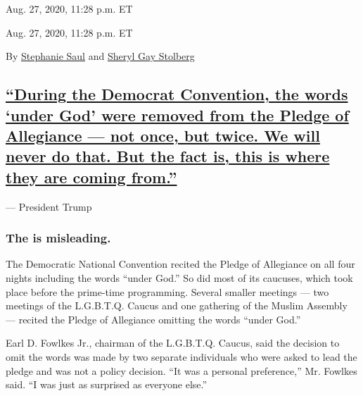 Aug. 27, 2020, 11:28 p.m. ET

Aug. 27, 2020, 11:28 p.m. ET

By \href{https://www.nytimes3xbfgragh.onion/by/stephanie-saul}{Stephanie
Saul} and
\href{https://www.nytimes3xbfgragh.onion/by/sheryl-gay-stolberg}{Sheryl
Gay Stolberg}

\hypertarget{during-the-democrat-convention-the-words-under-god-were-removed-from-the-pledge-of-allegiance--not-once-but-twice-we-will-never-do-that-but-the-fact-is-this-is-where-they-are-coming-from}{%
\subsection{\texorpdfstring{\protect\hyperlink{during-the-democrat-convention-the-words-under-god-were-removed-from-the-pledge-of-allegiance-not-once-but-twice-we-will-never-d}{``During
the Democrat Convention, the words `under God' were removed from the
Pledge of Allegiance --- not once, but twice. We will never do that. But
the fact is, this is where they are coming
from.''}}{``During the Democrat Convention, the words `under God' were removed from the Pledge of Allegiance --- not once, but twice. We will never do that. But the fact is, this is where they are coming from.''}}\label{during-the-democrat-convention-the-words-under-god-were-removed-from-the-pledge-of-allegiance--not-once-but-twice-we-will-never-do-that-but-the-fact-is-this-is-where-they-are-coming-from}}

--- President Trump

\hypertarget{the-is-misleading}{%
\subsubsection{The is misleading.}\label{the-is-misleading}}

The Democratic National Convention recited the Pledge of Allegiance on
all four nights including the words ``under God.'' So did most of its
caucuses, which took place before the prime-time programming. Several
smaller meetings --- two meetings of the L.G.B.T.Q. Caucus and one
gathering of the Muslim Assembly --- recited the Pledge of Allegiance
omitting the words ``under God.''

Earl D. Fowlkes Jr., chairman of the L.G.B.T.Q. Caucus, said the
decision to omit the words was made by two separate individuals who were
asked to lead the pledge and was not a policy decision. ``It was a
personal preference,'' Mr. Fowlkes said. ``I was just as surprised as
everyone else.''

